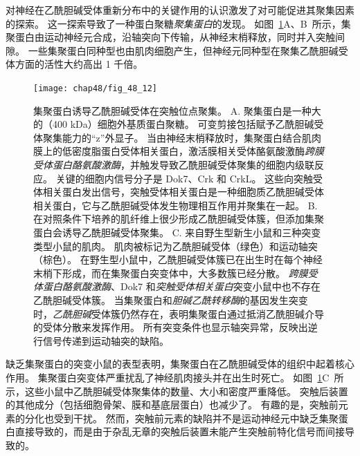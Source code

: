 对神经在乙酰胆碱受体重新分布中的关键作用的认识激发了对可能促进其聚集因素的探索。
这一探索导致了一种蛋白聚糖\textit{聚集蛋白}的发现。
如图~\ref{fig:48_12}A、B~所示，集聚蛋白由运动神经元合成，沿轴突向下传输，从神经末梢释放，同时并入突触间隙。
一些集聚蛋白同种型也由肌肉细胞产生，但神经元同种型在聚集乙酰胆碱受体方面的活性大约高出 1 千倍。


\begin{figure}[htbp]
	\centering
	\texttt{[image: chap48/fig\_48\_12]}
	\caption{集聚蛋白诱导乙酰胆碱受体在突触位点聚集。
		A. 聚集蛋白是一种大的（400 kDa）细胞外基质蛋白聚糖。
		可变剪接包括赋予乙酰胆碱受体聚集能力的“z”外显子。
		当由神经末梢释放时，集聚蛋白结合肌肉膜上的低密度脂蛋白受体相关蛋白，激活膜相关受体酪氨酸激酶\textit{跨膜受体蛋白酪氨酸激酶}，并触发导致乙酰胆碱受体聚集的细胞内级联反应。
		关键的细胞内信号分子是 Dok7、Crk 和 CrkL。
		这些向突触受体相关蛋白发出信号，突触受体相关蛋白是一种细胞质乙酰胆碱受体相关蛋白，它与乙酰胆碱受体发生物理相互作用并聚集在一起\cite{dechiara1996receptor}。
		B. 在对照条件下培养的肌纤维上很少形成乙酰胆碱受体簇，但添加集聚蛋白会诱导乙酰胆碱受体聚集\cite{misgeld2005agrin}。
		C. 来自野生型新生小鼠和三种突变类型小鼠的肌肉。
		肌肉被标记为乙酰胆碱受体（绿色）和运动轴突（棕色）。
		在野生型小鼠中，乙酰胆碱受体簇已在出生时在每个神经末梢下形成，而在集聚蛋白突变体中，大多数簇已经分散。
		\textit{跨膜受体蛋白酪氨酸激酶}、Dok7 和\textit{突触受体相关蛋白}突变小鼠中也不存在乙酰胆碱受体簇。
		当集聚蛋白和\textit{胆碱乙酰转移酶}的基因发生突变时，\textit{乙酰胆碱}受体簇仍然存在，表明集聚蛋白通过抵消乙酰胆碱介导的受体分散来发挥作用。
		所有突变条件也显示轴突异常，反映出逆行信号传递到运动轴突的缺陷\cite{gautam1996defective}。}
	\label{fig:48_12}
\end{figure}


缺乏集聚蛋白的突变小鼠的表型表明，集聚蛋白在乙酰胆碱受体的组织中起着核心作用。
集聚蛋白突变体严重扰乱了神经肌肉接头并在出生时死亡。
如图~\ref{fig:48_12}C~所示，这些小鼠中乙酰胆碱受体聚集体的数量、大小和密度严重降低。
突触后装置的其他成分（包括细胞骨架、膜和基底层蛋白）也减少了。
有趣的是，突触前元素的分化也受到干扰。
然而，突触前元素的缺陷并不是运动神经元中缺乏集聚蛋白直接导致的，而是由于杂乱无章的突触后装置未能产生突触前特化信号而间接导致的。


